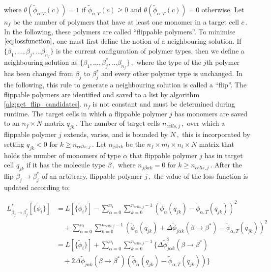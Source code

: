 \documentclass[bachelor,       %
               twoside,        %
               BCOR10mm,       %
               ngerman, english %
               ]{GAUBM}
\begin{document}
where $\theta(\tilde{\phi}_{\alpha,T}(c))=1$ if $\tilde{\phi}_{\alpha,T}(c)\ge 0$ and $\theta(\tilde{\phi}_{\alpha,T}(c))=0$ otherwise. Let $n_f$ be the number of polymers that have at least one monomer in a target cell $c\,.$ In the following, these polymers are called \enquote{flippable polymers}. To minimise $\eqref{eq:lossfunction}$, one must first define the notion of a neighbouring solution. If $\{\beta_1,\dots,\beta_j,\dots\beta_{n_f}\}$ is the current configuration of polymer types, then we define a neighbouring solution as $\{\beta_1,\dots,\beta^*_j,\dots\beta_{n_f}\}\,,$ where the type of the $j$th polymer has been changed from $\beta_j$ to $\beta_j^*$ and every other polymer type is unchanged. In the following, this rule to generate a neighbouring solution is called a \enquote{flip}. The flippable polymers are identified and saved to a list by algorithm \ref{alg:get_flip_candidates}. $n_f$ is not constant and must be determined during runtime. The target cells in which a flippable polymer $j$ has monomers are saved to an $n_f\times N$ matrix $q_{jk}\,.$ The number of target cells $n_{cells,j}\,,$ over which a flippable polymer $j$ extends, varies, and is bounded by $N\,,$ this is incorporated by setting $q_{jk}<0$ for $k\ge n_{cells,j}\,.$ Let $n_{j\beta\alpha k}$ be the $n_f\times m_t\times n_t\times N$ matrix that holds the number of monomers of type $\alpha$ that flippable polymer $j$ has in target cell $q_{jk}$ if it has the molecule type $\beta\,,$ where $n_{j\beta\alpha k}=0$ for $k\ge n_{cells,j}\,.$ After the flip $\beta_j\rightarrow \beta_j^*$ of an arbitrary, flippable polymer $j\,,$ the value of the loss function is updated according to:

\begin{align}
    L^*_{\beta_j\rightarrow\beta_j^*}[\{\tilde\phi_i\}] &= L[\{\tilde\phi_i\}] 
    - \sum_{\alpha=0}^{n_t}\sum_{k=0}^{n_{cells,j}-1}  \left(\tilde{\phi}_\alpha(q_{jk})-\tilde{\phi}_{\alpha,T}(q_{jk})\right)^2\nonumber \\
    & \quad + \sum_{\alpha=0}^{n_t}\sum_{k=0}^{n_{cells,j}-1}  \left(\tilde{\phi}_\alpha(q_{jk})+\Delta\tilde\phi_{ j\alpha k}(\beta\rightarrow\beta^*)-\tilde{\phi}_{\alpha,T}(q_{jk})\right)^2\nonumber \\
    &= L[\{\tilde\phi_i\}] 
    + \sum_{\alpha=0}^{n_t}\sum_{k=0}^{n_{cells,j}-1}  \biggl\{\Delta\tilde\phi^2_{ j\alpha k}(\beta\rightarrow\beta^*) \nonumber\\
    &\quad + 2\Delta\tilde\phi_{ j\alpha k}(\beta\rightarrow\beta^*)\left(\tilde\phi_{\alpha}(q_{jk})-\tilde\phi_{\alpha,T}(q_{jk})\right)\biggr\}
\end{align}
\end{document}
